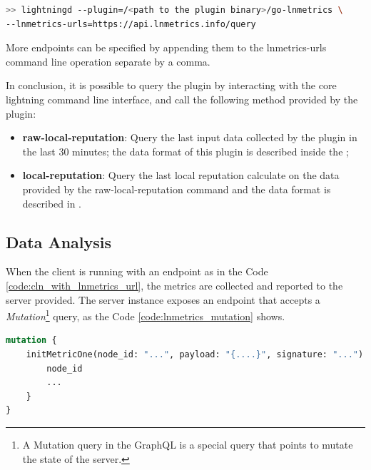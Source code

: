 \begin{lstlisting}[language=bash, basicstyle=\small,
                  caption={Command to run core lightning with the lnmetrics plugin an publish the data.}, 
                  label={code:cln_with_lnmetrics_url}]
>> lightningd --plugin=/<path to the plugin binary>/go-lnmetrics \ 
--lnmetrics-urls=https://api.lnmetrics.info/query
\end{lstlisting}

More endpoints can be specified by appending them to the lnmetrics-urls command line operation separate by a comma.

In conclusion, it is possible to query the plugin by interacting with the core lightning command line interface,
and call the following method provided by the plugin:

\begin{itemize}
    \item {\bf raw-local-reputation}: Query the last input data collected by the plugin in the last 30 minutes; 
        the data format of this plugin is described inside the \cite{lnmetrics_localreputation};
    \item {\bf local-reputation}: Query the last local reputation calculate on the data provided by the 
        raw-local-reputation command and the data format is described in \cite{lnmetrics_localreputation}.
\end{itemize}

\subsection{Data Analysis}

When the client is running with an endpoint as in the Code \ref{code:cln_with_lnmetrics_url},
the metrics are collected and reported to the server provided. The server instance exposes an
endpoint that accepts a \emph{Mutation}\footnote{A Mutation query in the GraphQL is a special query that points to mutate the state of the server.} query,
as the Code \ref{code:lnmetrics_mutation} shows.

\begin{lstlisting}[language=graphql, basicstyle=\small,
                  caption={Mutation query call by the client to initialise the metric on the server.}, 
                  label={code:lnmetrics_mutation}]
mutation {
    initMetricOne(node_id: "...", payload: "{....}", signature: "...") {
        node_id
        ...
    }
}
\end{lstlisting}

